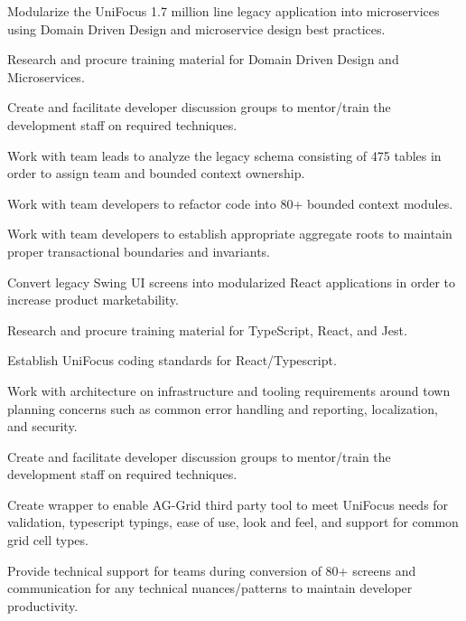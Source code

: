\documentclass[]{deedy-resume}
\begin{document}
\begin{minipage}[t]{1.0\textwidth}
Modularize the UniFocus 1.7 million line legacy application into microservices using Domain Driven Design and microservice design best practices.
\begin{tightemize}
\item Research and procure training material for Domain Driven Design and Microservices.
\item Create and facilitate developer discussion groups to mentor/train the development staff on required techniques.
\item Work with team leads to analyze the legacy schema consisting of 475 tables in order to assign team and bounded context ownership. 
\item Work with team developers to refactor code into 80+ bounded context modules.
\item Work with team developers to establish appropriate aggregate roots to maintain proper transactional boundaries and invariants. 
\end{tightemize}
\sectionsep

Convert legacy Swing UI screens into modularized React applications in order to increase product marketability.
\begin{tightemize}
\item Research and procure training material for TypeScript, React, and Jest.
\item Establish UniFocus coding standards for React/Typescript.
\item Work with architecture on infrastructure and tooling requirements around town planning concerns such as common error handling and reporting, localization, and security.
\item Create and facilitate developer discussion groups to mentor/train the development staff on required techniques.
\item Create wrapper to enable AG-Grid third party tool to meet UniFocus needs for validation, typescript typings, ease of use, look and feel, and support for common grid cell types.
\item Provide technical support for teams during conversion of 80+ screens and communication for any technical nuances/patterns to maintain developer productivity.
\end{tightemize}
\sectionsep


\end{minipage}
\end{document}
